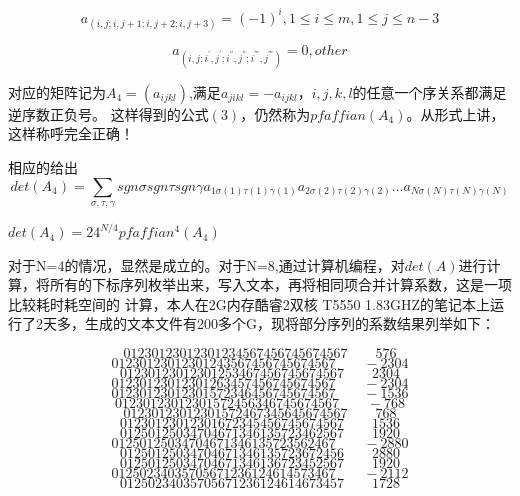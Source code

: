 \documentclass[twoside,a4paper,CCT]{cctart}   %
\begin{document}
   \begin{equation}a_{(i,j;i,j+1;i,j+2;i,j+3)}=(-1)^{i},1\leq i \leq m,1\leq j\leq n-3\end{equation}

   \begin{equation}a_{(i,j;i^{'},j^{'};i^{''},j^{''};i^{'''},j^{'''})}=0,other \end{equation}

   对应的矩阵记为$A_{4}=(a_{ijkl})$,满足$a_{jikl}=-a_{ijkl}$，$i,j,k,l$的任意一个序关系都满足逆序数正负号。
   这样得到的公式$(3)$，仍然称为$pfaffian(A_{4})$。从形式上讲，这样称呼完全正确！

   相应的给出
   \begin{equation}det(A_{4})=\sum\limits_{\sigma,\tau,\gamma}sgn\sigma sgn\tau sgn\gamma a_{1\sigma(1)\tau(1)\gamma(1)}a_{2\sigma(2)\tau(2)\gamma(2)}...a_{N\sigma(N)\tau(N)\gamma(N)}\end{equation}

\begin{guess}\quad $det(A_{4})=24^{N/4}pfaffian^{4}(A_{4})$\end{guess}
   对于N=4的情况，显然是成立的。对于N=8,通过计算机编程，对$det(A)$进行计算，将所有的下标序列枚举出来，写入文本，再将相同项合并计算系数，这是一项比较耗时耗空间的
   计算，本人在2G内存酷睿2双核 T5550 1.83GHZ的笔记本上运行了2天多，生成的文本文件有200多个G，现将部分序列的系数结果列举如下：

    $$01230123012301234567456745674567  \quad  \quad576$$
    $$01230123012301243567456745674567    \quad \quad-2304$$
    $$01230123012301253467456745674567     \quad \quad2304$$
    $$01230123012301263457456745674567    \quad \quad-2304$$
    $$01230123012301572346456745674567    \quad \quad-1536  $$
$$01230123012301572456346745674567     \quad \quad-768$$
$$01230123012301572467345645674567      \quad \quad768 $$
$$01230123012301672345456745674567     \quad \quad1536  $$
$$01250125034704671346135723462567     \quad \quad1920 $$
$$01250125034704671346135723562467    \quad \quad-2880 $$
$$01250125034704671346135723672456     \quad \quad2880$$
$$01250125034704671346136723452567     \quad \quad1920$$
$$01250234035705671236124614573467    \quad \quad-2112$$
$$01250234035705671236124614673457     \quad \quad1728$$
\end{document}

